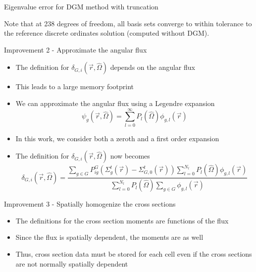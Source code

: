 \documentclass[final]{beamer}
\begin{document}
\begin{frame}{}
\begin{columns}[t]
\begin{column}{0.32\linewidth}
\begin{block}{Eigenvalue error for DGM method with truncation}
\begin{figure}[H]
                \end{figure}
                Note that at 238 degrees of freedom, all basis sets converge to within tolerance to the reference discrete ordinates solution (computed without DGM).
            \end{block}
            \vspace{0.55eX}
            \begin{block}{Improvement 2 - Approximate the angular flux}
                \begin{itemize}
                \item The definition for $\delta_{G,i}(\vec{r}, \hat{\Omega})$ depends on the angular flux
                \item This leads to a large memory footprint
                \item We can approximate the angular flux using a Legendre expansion
                \begin{equation*}
                    \psi_{g}(\vec{r}, \hat{\Omega})=\sum_{l=0}^\infty P_l(\hat{\Omega})\phi_{g, l}(\vec{r})
                \end{equation*}
                \item In this work, we consider both a zeroth and a first order expansion
                \item The definition for $\delta_{G,i}(\vec{r}, \hat{\Omega})$ now becomes
                \begin{equation*}
                    \delta_{G,i}(\vec{r}, \hat{\Omega}) 
                    = \frac{\sum\limits_{g\in G} P^G_{ig} \left(\Sigma^t_{g}(\vec{r}) - \Sigma^t_{G,0}(\vec{r}) \right) \sum\limits_{l=0}^{N_l} P_l(\hat{\Omega})\phi_{g, l}(\vec{r})}
                        {\sum\limits_{l=0}^{N_l} P_l(\hat{\Omega})\sum\limits_{g\in G} \phi_{g, l}(\vec{r})}
                \end{equation*}
                \end{itemize}
            \end{block}
            \vspace{0.55eX}
            \begin{block}{Improvement 3 - Spatially homogenize the cross sections}
                \begin{itemize}
                    \item The definitions for the cross section moments are functions of the flux
                    \item Since the flux is spatially dependent, the moments are as well
                    \item Thus, cross section data must be stored for each cell even if the cross sections are not normally spatially dependent

\end{itemize}
\end{block}
\end{column}
\end{columns}
\end{frame}
\end{document}
